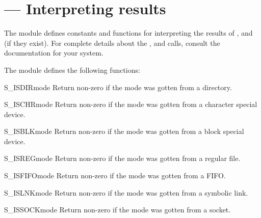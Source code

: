 \section{ ---
         Interpreting  results}



The  module defines constants and functions for
interpreting the results of ,
 and  (if they exist).  For
complete details about the ,  and
 calls, consult the documentation for your system.

The  module defines the following functions:


\begin{funcdesc}{S_ISDIR}{mode}
Return non-zero if the mode was gotten from a directory.
\end{funcdesc}

\begin{funcdesc}{S_ISCHR}{mode}
Return non-zero if the mode was gotten from a character special device.
\end{funcdesc}

\begin{funcdesc}{S_ISBLK}{mode}
Return non-zero if the mode was gotten from a block special device.
\end{funcdesc}

\begin{funcdesc}{S_ISREG}{mode}
Return non-zero if the mode was gotten from a regular file.
\end{funcdesc}

\begin{funcdesc}{S_ISFIFO}{mode}
Return non-zero if the mode was gotten from a FIFO.
\end{funcdesc}

\begin{funcdesc}{S_ISLNK}{mode}
Return non-zero if the mode was gotten from a symbolic link.
\end{funcdesc}

\begin{funcdesc}{S_ISSOCK}{mode}
Return non-zero if the mode was gotten from a socket.
\end{funcdesc}


